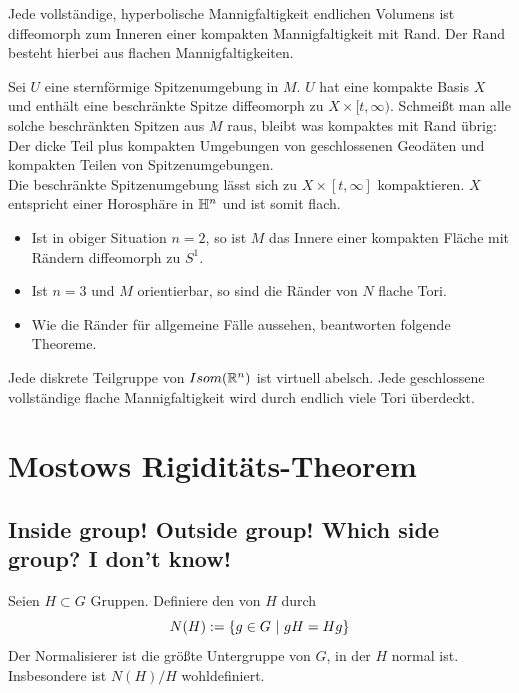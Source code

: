 \documentclass{book}
\begin{document}
\Kor{}
Jede vollständige, hyperbolische Mannigfaltigkeit endlichen Volumens ist diffeomorph zum Inneren einer kompakten Mannigfaltigkeit mit Rand. Der Rand besteht hierbei aus flachen Mannigfaltigkeiten.
\begin{Beweis}{}
	Sei $U$ eine sternförmige Spitzenumgebung in $M$. $U$ hat eine kompakte Basis $X$ und enthält eine beschränkte Spitze diffeomorph zu $X \times [t, \infty)$. Schmeißt man alle solche beschränkten Spitzen aus $M$ raus, bleibt was kompaktes mit Rand übrig: Der dicke Teil plus kompakten Umgebungen von geschlossenen Geodäten und kompakten Teilen von Spitzenumgebungen.\\
	Die beschränkte Spitzenumgebung lässt sich zu $X\times [t,\infty]$ kompaktieren. $X$ entspricht einer Horosphäre in $\mathbb{H}^n$ und ist somit flach.
\end{Beweis}

\Bem{}
\begin{itemize}
	\item Ist in obiger Situation $n = 2$, so ist $M$ das Innere einer kompakten Fläche mit Rändern diffeomorph zu $S^1$.
	\item Ist $n = 3$ und $M$ orientierbar, so sind die Ränder von $N$ flache Tori.
	\item Wie die Ränder für allgemeine Fälle aussehen, beantworten folgende Theoreme.
\end{itemize}

\Satz{}
\label{IsomRn}
Jede diskrete Teilgruppe von $Isom(\mathbb{R}^n)$ ist virtuell abelsch.
Jede geschlossene vollständige flache Mannigfaltigkeit wird durch endlich viele Tori überdeckt.

\chapter{Mostows Rigiditäts-Theorem}
\section{Inside group! Outside group! Which side group? I don't know!}
\Def{}
Seien $H\subset G$ Gruppen. Definiere den  von $H$ durch
\[ N(H) := \set{g \in G}{ gH = Hg } \]
Der Normalisierer ist die größte Untergruppe von $G$, in der $H$ normal ist. Insbesondere ist $N(H) /H$ wohldefiniert.
\end{document}
